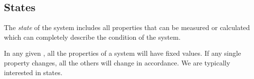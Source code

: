 \subsection{States}\label{subsec:States}
\begin{definition}[State]\label{def:State}
  The \emph{state} of the system includes all properties that can be measured or calculated which can completely describe the condition of the system.
\end{definition}

In any given , all the properties of a system will have fixed values.
If any single property changes, all the others will change in accordance.
We are typically interested in  states.



